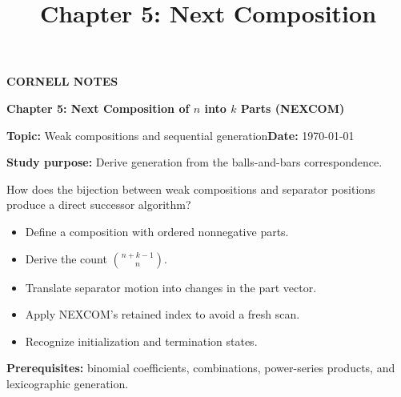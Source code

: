\documentclass[10pt,letterpaper]{article}
\title{Chapter 5: Next Composition}
\author{}
\date{}
\begin{document}
\maketitle
\begin{tcolorbox}[colback=Paper,colframe=Ink]{\small\bfseries\color{Teal}CORNELL NOTES}\par{\LARGE\bfseries Chapter 5: Next Composition of $n$ into $k$ Parts (NEXCOM)}\par\medskip\textbf{Topic:} Weak compositions and sequential generation\hfill\textbf{Date:} \today\par\textbf{Study purpose:} Derive generation from the balls-and-bars correspondence.\end{tcolorbox}
\begin{tcolorbox}[colback=Teal!5,colframe=Teal,title=Essential question]How does the bijection between weak compositions and separator positions produce a direct successor algorithm?\end{tcolorbox}
\begin{tcolorbox}[colback=white,colframe=Mist,title=Learning objectives]\begin{itemize}\item Define a composition with ordered nonnegative parts.\item Derive the count $\binom{n+k-1}{n}$.\item Translate separator motion into changes in the part vector.\item Apply NEXCOM's retained index to avoid a fresh scan.\item Recognize initialization and termination states.\end{itemize}\textbf{Prerequisites:} binomial coefficients, combinations, power-series products, and lexicographic generation.\end{tcolorbox}
\end{document}

